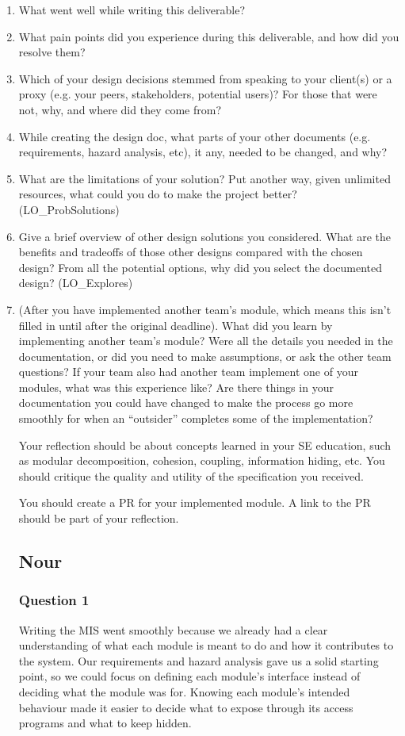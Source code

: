 \documentclass[12pt, titlepage]{article}
\begin{document}
\begin{enumerate}
  \item What went well while writing this deliverable? 
  \item What pain points did you experience during this deliverable, and how
    did you resolve them?
  \item Which of your design decisions stemmed from speaking to your client(s)
  or a proxy (e.g. your peers, stakeholders, potential users)? For those that
  were not, why, and where did they come from?
  \item While creating the design doc, what parts of your other documents (e.g.
  requirements, hazard analysis, etc), it any, needed to be changed, and why?
  \item What are the limitations of your solution?  Put another way, given
  unlimited resources, what could you do to make the project better? (LO\_ProbSolutions)
  \item Give a brief overview of other design solutions you considered.  What
  are the benefits and tradeoffs of those other designs compared with the chosen
  design?  From all the potential options, why did you select the documented design?
  (LO\_Explores)
  \item (After you have implemented another team's module, which means this
  isn't filled in until after the original deadline). What did you learn by
  implementing another team's module? Were all the details you needed in the
  documentation, or did you need to make assumptions, or ask the other team
  questions?  If your team also had another team implement one of your modules,
  what was this experience like?  Are there things in your documentation you
  could have changed to make the process go more smoothly for when an
  ``outsider'' completes some of the implementation?

  Your reflection should be about concepts learned in your SE education, such as modular decomposition, cohesion, coupling, information hiding, etc.  You should critique the quality and utility of the specification you received.

  You should create a PR for your implemented module.  A link to the PR should be part of your reflection.

\subsection*{Nour}
\subsubsection*{Question 1}
Writing the MIS went smoothly because we already had a clear understanding of what each module is meant to do and how it contributes to the system. Our requirements and hazard analysis gave us a solid starting point, so we could focus on defining each module’s interface instead of deciding what the module was for. 
Knowing each module’s intended behaviour made it easier to decide what to expose through its access programs and what to keep hidden.

\end{enumerate}
\end{document}
